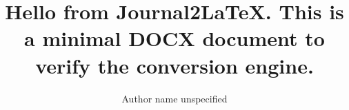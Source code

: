 \documentclass{default}
\begin{document}
\journalheader

\title{Hello from Journal2LaTeX. This is a minimal DOCX document to verify the conversion engine.}
\author{Author name unspecified}
\date{}
\maketitle

\begin{abstract}

\end{abstract}
\end{document}
